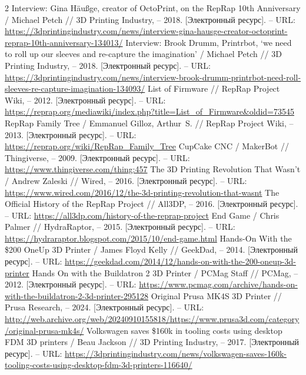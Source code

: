 \documentclass{article}
\begin{document}
\begin{thebibliography}{2}
 Interview: Gina Häußge, creator of OctoPrint, on the RepRap 10th Anniversary / Michael Petch // 3D Printing Industry, – 2018. [Электронный ресурс]. – URL: \url{https://3dprintingindustry.com/news/interview-gina-hausge-creator-octoprint-reprap-10th-anniversary-134013/}
 Interview: Brook Drumm, Printrbot, ‘we need to roll up our sleeves and re-capture the imagination’ / Michael Petch // 3D Printing Industry, – 2018. [Электронный ресурс]. – URL: \url{https://3dprintingindustry.com/news/interview-brook-drumm-printrbot-need-roll-sleeves-re-capture-imagination-134093/}
 List of Firmware // RepRap Project Wiki, – 2012. [Электронный ресурс]. – URL: \url{https://reprap.org/mediawiki/index.php?title=List_of_Firmware&oldid=73545}
 RepRap Family Tree / Emmanuel Gilloz, Arthur~S. // RepRap Project Wiki, – 2013. [Электронный ресурс]. – URL: \url{https://reprap.org/wiki/RepRap_Family_Tree}
 CupCake CNC / MakerBot // Thingiverse, – 2009. [Электронный ресурс]. – URL: \url{https://www.thingiverse.com/thing:457}
 The 3D Printing Revolution That Wasn’t / Andrew Zaleski // Wired, – 2016. [Электронный ресурс]. – URL: \url{https://www.wired.com/2016/12/the-3d-printing-revolution-that-wasnt}
 The Official History of the RepRap Project // All3DP, – 2016. [Электронный ресурс]. – URL: \url{https://all3dp.com/history-of-the-reprap-project}
 End Game / Chris Palmer // HydraRaptor, – 2015. [Электронный ресурс]. – URL: \url{https://hydraraptor.blogspot.com/2015/10/end-game.html}
 Hands-On With the \$200 OneUp 3D Printer / James Floyd Kelly // GeekDad, – 2014. [Электронный ресурс]. – URL: \url{https://geekdad.com/2014/12/hands-on-with-the-200-oneup-3d-printer}
 Hands On with the Buildatron 2 3D Printer / PCMag Staff // PCMag, – 2012. [Электронный ресурс]. – URL: \url{https://www.pcmag.com/archive/hands-on-with-the-buildatron-2-3d-printer-295128}
 Original Prusa MK4S 3D Printer // Prusa Research, – 2024. [Электронный ресурс]. – URL: \url{http://web.archive.org/web/20240910155818/https://www.prusa3d.com/category/original-prusa-mk4s/}
 Volkswagen saves \$160k in tooling costs using desktop FDM 3D printers / Beau Jackson // 3D Printing Industry, – 2017. [Электронный ресурс]. – URL: \url{https://3dprintingindustry.com/news/volkswagen-saves-160k-tooling-costs-using-desktop-fdm-3d-printers-116640/}

\end{thebibliography}
\end{document}
